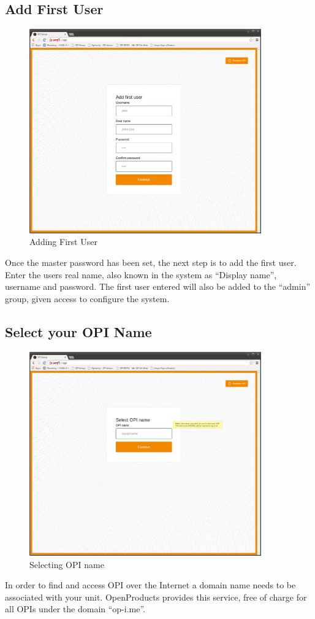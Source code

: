 \documentclass[12pt,a4paper,titlepage]{article}
\begin{document}
\newpage
\subsection{Add First User}
\begin{figure}[h!]
\centering
\includegraphics[width=10cm]{./img/first_user}
\caption{Adding First User}
\end{figure}
Once the master password has been set, the next step is to add the first user. Enter the users real name, also known in the system as ``Display name'', username and password. The first user entered will also be added to the ``admin'' group, given access to configure the system.
\newpage
\subsection{Select your OPI Name}
\begin{figure}[h!]
\centering
\includegraphics[width=10cm]{./img/opiname}
\caption{Selecting OPI name}
\end{figure}
In order to find and access OPI over the Internet a domain name needs to be associated with your unit. OpenProducts provides this service, free of charge for all OPIs under the domain “op-i.me”.
\end{document}
